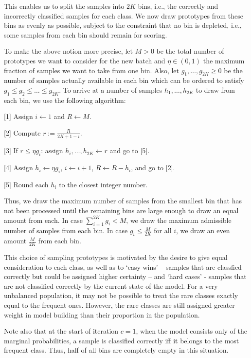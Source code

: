 This enables us to split the samples into $2K$ bins, i.e., the correctly and incorrectly classified samples for each class.
We now draw prototypes from these bins as evenly as possible, subject to the constraint that no bin is depleted, i.e., some samples from each bin should remain for scoring.\par
%
To make the above notion more precise, let $M>0$ be the total number of prototypes we want to consider for the new batch and $\eta\in(0,1)$ the  maximum fraction of samples we want to take from one bin.
Also, let $g_1,\dots, g_{2K}\geq0$ be the number of samples actually available in each bin which can be ordered to satisfy $g_1\leq g_2\leq\dots\leq g_{2K}$.
To arrive at a number of samples $h_1,\dots,h_{2K}$ to draw from each bin, we use the following algorithm:
%
\begin{description}
\item{[1]} Assign $i\leftarrow1$ and $R\leftarrow M$.
%
\item{[2]} Compute $r:=\frac{R}{2K+1-i}$.
%
\item{[3]} If $r\leq\eta g_i$: assign $h_i,\dots,h_{2K}\leftarrow r$ and go to [5].
%
\item{[4]} Assign $h_i\leftarrow\eta g_i$, $i\leftarrow i+1$, $R\leftarrow R-h_i$, and go to [2].
%
\item{[5]} Round each $h_i$ to the closest integer number.
\end{description}
%
Thus, we draw the maximum number of samples from the smallest bin that has not been processed until the remaining bins are large enough to draw an equal amount from each.
In case $\sum_{i=1}^{2K}g_i<M$,  we draw the maximum admissible number of samples from each bin.
In case $g_i\leq\frac{M}{2K}$ for all $i$, we draw an even amount $\frac{M}{2K}$ from each bin.\par
%
\begin{remark}
This choice of sampling prototypes is motivated by the desire to give equal consideration to each class, as well as to `easy wins' -- samples that are classfied correctly but could be assigned higher certainty -- and `hard cases' - samples that are not classified correctly by the current state of the model.
For a very unbalanced population, it may not be possible to treat the rare classes exactly equal to the frequent ones.
However, the rare classes are still assigned greater weight in model building than their proportion in the population.\par
%
Note also that at the start of iteration $c=1$, when the model consists only of the marginal probabilities, a sample is classified correctly iff it belongs to the most frequent class.
Thus, half of all bins are completely empty in this situation.
\end{remark}
